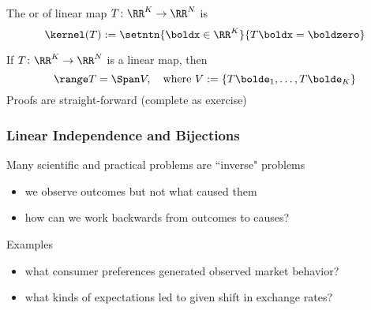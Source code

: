 \begin{frame}
    
    \vspace{2em}
    The  or  of linear map $T \colon \RR^K \to
    \RR^N$ is
    \begin{equation*}
        \kernel(T) := \setntn{\boldx \in \RR^K}{T\boldx = \boldzero}
    \end{equation*}

    \vspace{.7em}
    \Fact{\eqref{ET-fa:res}}
    If $T \colon \RR^K \to \RR^N$ is a linear map, then 
    \begin{equation*}
        \range T = \Span V,
        \quad \text{where } 
        V := \{T\bolde_1, \ldots, T\bolde_K\}
    \end{equation*}
    Proofs are straight-forward (complete as exercise)
    
\end{frame}

\begin{frame}
    
    \frametitle{Linear Independence and Bijections}

    \vspace{.7em}
    Many scientific and practical problems are ``inverse" problems

    \begin{itemize}
        \item we observe outcomes but not what caused them
        \item how can we work backwards from outcomes to causes?
    \end{itemize}
    
    Examples

    \begin{itemize}
        \item what consumer preferences generated observed market behavior?
        \item what kinds of expectations led to given shift in exchange rates?
    \end{itemize}

\end{frame}

